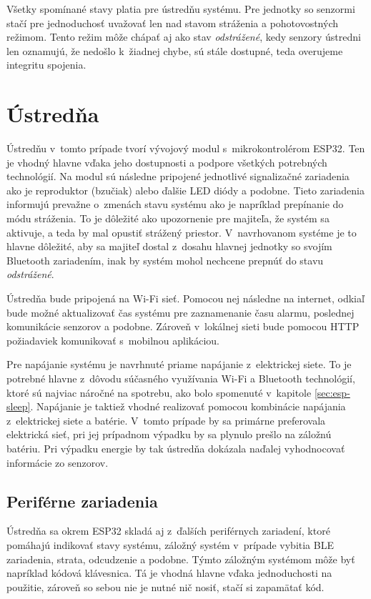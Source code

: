 Všetky spomínané stavy platia pre ústredňu systému. Pre jednotky so senzormi stačí pre jednoduchosť uvažovať len nad stavom stráženia a pohotovostných režimom. Tento režim môže chápať aj ako stav \textit{odstrážené}, kedy senzory ústredni len oznamujú, že nedošlo k~žiadnej chybe, sú stále dostupné, teda overujeme integritu spojenia.

\section{Ústredňa}

Ústredňu v~tomto prípade tvorí vývojový modul s~mikrokontrolérom ESP32. Ten je vhodný hlavne vďaka jeho dostupnosti a podpore všetkých potrebných technológií. Na modul sú následne pripojené jednotlivé signalizačné zariadenia ako je reproduktor (bzučiak) alebo ďalšie LED diódy a podobne. Tieto zariadenia informujú prevažne o~zmenách stavu systému ako je napríklad prepínanie do módu stráženia. To je dôležité ako upozornenie pre majiteľa, že systém sa aktivuje, a teda by mal opustiť strážený priestor. V~navrhovanom systéme je to hlavne dôležité, aby sa majiteľ dostal z~dosahu hlavnej jednotky so svojím Bluetooth zariadením, inak by systém mohol nechcene prepnúť do stavu \textit{odstrážené}.

Ústredňa bude pripojená na Wi-Fi sieť. Pomocou nej následne na internet, odkiaľ bude možné aktualizovať čas systému pre zaznamenanie času alarmu, poslednej komunikácie senzorov a podobne. Zároveň v~lokálnej sieti bude pomocou HTTP požiadaviek komunikovať s~mobilnou aplikáciou.

Pre napájanie systému je navrhnuté priame napájanie z~elektrickej siete. To je potrebné hlavne z~dôvodu súčasného využívania Wi-Fi a Bluetooth technológií, ktoré sú najviac náročné na spotrebu, ako bolo spomenuté v~kapitole \ref{sec:esp-sleep}. Napájanie je taktiež vhodné realizovať pomocou kombinácie napájania z~elektrickej siete a batérie. V~tomto prípade by sa primárne preferovala elektrická sieť, pri jej prípadnom výpadku by sa plynulo prešlo na záložnú batériu. Pri výpadku energie by tak ústredňa dokázala naďalej vyhodnocovať informácie zo senzorov.

\subsection{Periférne zariadenia}

Ústredňa sa okrem ESP32 skladá aj z~ďalších periférnych zariadení, ktoré pomáhajú indikovať stavy systému, záložný systém v~prípade vybitia BLE zariadenia, strata, odcudzenie a podobne. Týmto záložným systémom môže byť napríklad kódová klávesnica. Tá je vhodná hlavne vďaka jednoduchosti na použitie, zároveň so sebou nie je nutné nič nosiť, stačí si zapamätať kód.

